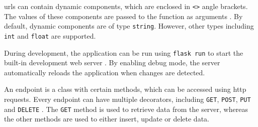 \acp{url} can contain dynamic components, which are enclosed in \texttt{<>} angle brackets.
The values of these components are passed to the function as arguments \cite{flask_book2018}.
By default, dynamic components are of type \texttt{string}.
However, other types including \texttt{int} and \texttt{float} are supported.

During development, the \flask{} application can be run using \texttt{flask run} to start the built-in development web server \cite{flask_book2018}.
By enabling debug mode, the server automatically reloads the application when changes are detected.

An endpoint is a class with certain methods, which can be accessed using \ac{http} requests.
Every endpoint can have multiple decorators, including \texttt{GET}, \texttt{POST}, \texttt{PUT} and \texttt{DELETE} \cite{flask2018}.
The \texttt{GET} method is used to retrieve data from the server, whereas the other methods are used to either insert, update or delete data.
